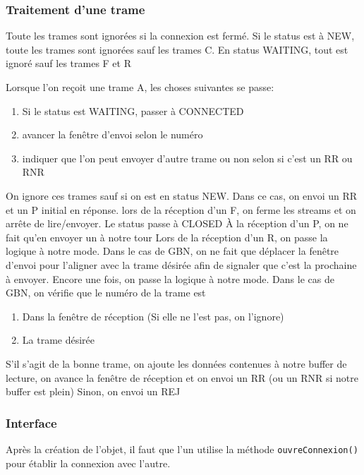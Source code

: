 \documentclass{article}
\newcounter{subsubsubsection}[subsubsection]
\begin{document}
    \subsubsection{Traitement d'une trame}
    Toute les trames sont ignorées si la connexion est fermé. Si le status est à NEW, toute les trames sont ignorées sauf les trames C. En status WAITING, tout est ignoré sauf les trames F et R

    Lorsque l'on reçoit une trame A, les choses suivantes se passe:
    \begin{enumerate}
        \item Si le status est WAITING, passer à CONNECTED
        \item avancer la fenêtre d'envoi selon le numéro
        \item indiquer que l'on peut envoyer d'autre trame ou non selon si c'est un RR ou RNR
    \end{enumerate}
        On ignore ces trames sauf si on est en status NEW. Dans ce cas, on envoi un RR et un P initial en réponse.
        lors de la réception d'un F, on ferme les streams et on arrête de lire/envoyer. Le status passe à CLOSED
        À la réception d'un P, on ne fait qu'en envoyer un à notre tour
        Lors de la réception d'un R, on passe la logique à notre mode. Dans le cas de GBN, on ne fait que déplacer la fenêtre d'envoi pour l'aligner avec la trame désirée afin de signaler que c'est la prochaine à envoyer.
        Encore une fois, on passe la logique à notre mode. Dans le cas de GBN, on vérifie que le numéro de la trame est 
        \begin{enumerate}
            \item Dans la fenêtre de réception (Si elle ne l'est pas, on l'ignore)
            \item La trame désirée
        \end{enumerate}
        S'il s'agit de la bonne trame, on ajoute les données contenues à notre buffer de lecture, on avance la fenêtre de réception et on envoi un RR (ou un RNR si notre buffer est plein)
        Sinon, on envoi un REJ

    \subsubsection{Interface}
    Après la création de l'objet, il faut que l'un utilise la méthode \verb#ouvreConnexion()# pour établir la connexion avec l'autre. 
    
\end{document}
